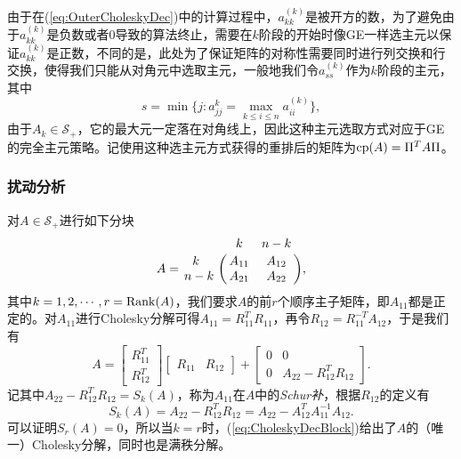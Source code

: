 \documentclass[a4paper,10pt]{ctexart}
\begin{document}
由于在(\ref{eq:OuterCholeskyDec})中的计算过程中，$ a^{(k)}_{kk} $是被开方的数，为了避免由于$ a^{(k)}_{kk} $是负数或者0导致的算法终止，需要在$ k $阶段的开始时像GE一样选主元以保证$ a^{(k)}_{kk} $是正数，不同的是，此处为了保证矩阵的对称性需要同时进行列交换和行交换，使得我们只能从对角元中选取主元，一般地我们令$ a_{ss}^{(k)} $作为$ k $阶段的主元，其中
\[
    s = \min\{j:a_{jj}^{k} = \max_{k\leqslant i\leqslant n}a_{ii}^{(k)}\},
\]
由于$ A_k\in \mathcal{S}_+ $，它的最大元一定落在对角线上，因此这种主元选取方式对应于GE的完全主元策略。记使用这种选主元方式获得的重排后的矩阵为$ {\rm cp}(A) = \Pi^T A \Pi $。

\subsubsection{扰动分析}
对$ A\in \mathcal{S}_+ $进行如下分块
\begin{equation}
    A = 
    \bordermatrix{
         & k & n-k \cr
        \ \ k& A_{11} & A_{12} \cr
        n-k & A_{21} & A_{22}
    },
\end{equation}
其中$ k=1,2,\cdots ,r={\rm Rank}(A) $，我们要求$ A $的前$ r $个顺序主子矩阵，即$ A_{11} $都是正定的。对$ A_{11} $进行Cholesky分解可得$ A_{11} = R_{11}^T R_{11} $，再令$ R_{12} = R_{11}^{-T}A_{12} $，于是我们有
\begin{equation}\label{eq:CholeskyDecBlock}
    A = 
    \begin{bmatrix} 
        R_{11}^T \\ R_{12}^T
    \end{bmatrix} 
    \begin{bmatrix} 
        R_{11} & R_{12}
    \end{bmatrix} +
    \begin{bmatrix} 
        0 & 0 \\
        0 & A_{22} - R_{12}^T R_{12}
    \end{bmatrix}.
\end{equation}
记其中$ A_{22} - R_{12}^T R_{12} = S_k(A) $，称为$ A_{11} $在$ A $中的\emph{Schur补}，根据$ R_{12} $的定义有
\[
    S_k(A) = A_{22} - R_{12}^T R_{12} = A_{22} - A_{12}^T A_{11}^{-1} A_{12}.
\]
可以证明$ S_r(A) = 0 $，所以当$ k=r $时，(\ref{eq:CholeskyDecBlock})给出了$ A $的（唯一）Cholesky分解，同时也是满秩分解。
\end{document}
